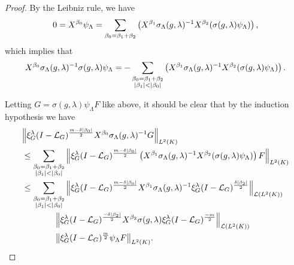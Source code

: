 \begin{proof}
    By the Leibniz rule,
    we have
    \begin{align*}
        0 =
        \LeftDifferentialOperator {\beta_0} \psi_\Lambda
        =
        \sum_{\beta_0 = \beta_1 + \beta_2}
        \left(
        \LeftDifferentialOperator {\beta_1} \sigma_\Lambda(g, \lambda)^{-1}
        \LeftDifferentialOperator {\beta_2} (\sigma(g, \lambda) \psi_\Lambda)\right),
    \end{align*}
    which implies that
    \begin{align*}
        \LeftDifferentialOperator {\beta_0} \sigma_{\Lambda}(g, \lambda)^{-1} \sigma(g, \lambda) \psi_\Lambda
        = -
        \sum_{\substack{
            \beta_0 = \beta_1 + \beta_2\\
            \abs {\beta_1} < \abs {\beta_0}}
        }
        \left(
        \LeftDifferentialOperator {\beta_1} \sigma_\Lambda(g, \lambda)^{-1}
        \LeftDifferentialOperator {\beta_2} (\sigma(g, \lambda) \psi_\Lambda)\right).
    \end{align*}

    Letting $G = \sigma(g, \lambda) \psi_\Lambda F$ like above,
    it should be clear that by the induction hypothesis we have
    \begin{align*}
        &\norm [\Lebesgue 2 \CompactGroup] {%
            \Rep \lambda \BesselPotential {m - \delta \abs {\beta_0}}
            \LeftDifferentialOperator {\beta_0} \sigma_\Lambda(g, \lambda)^{-1} G
        }\\
        &\leq
        \sum_{\substack{
            \beta_0 = \beta_1 + \beta_2\\
            \abs {\beta_1} < \abs {\beta_0}}
        }
        \norm [\Lebesgue 2 \CompactGroup] {%
            \Rep \lambda \BesselPotential {m - \delta \abs {\beta_0}}
            \left(
            \LeftDifferentialOperator {\beta_1} \sigma_\Lambda(g, \lambda)^{-1}
            \LeftDifferentialOperator {\beta_2} (\sigma(g, \lambda) \psi_\Lambda)\right) F
        }\\
        &\leq
        \sum_{\substack{
            \beta_0 = \beta_1 + \beta_2\\
            \abs {\beta_1} < \abs {\beta_0}}
        }
        \norm [\Lin {\Lebesgue 2 \CompactGroup}] {%
            \Rep \lambda \BesselPotential {m - \delta \abs {\beta_0}}
            \LeftDifferentialOperator {\beta_1} \sigma_\Lambda(g, \lambda)^{-1}
            \Rep \lambda \BesselPotential {\delta \abs {\beta_2}}
        }\\
        & \qquad\qquad
        \norm [\Lin {\Lebesgue 2 \CompactGroup}] {%
            \Rep \lambda \BesselPotential {-\delta \abs {\beta_2}}
            \LeftDifferentialOperator {\beta_2} \sigma(g, \lambda)
            \Rep \lambda \BesselPotential {-m}
        }\\
        & \qquad\qquad
        \norm [\Lebesgue 2 \CompactGroup] {\Rep \lambda \BesselPotential {m} \psi_\Lambda F}.
    \end{align*}


\end{proof}
